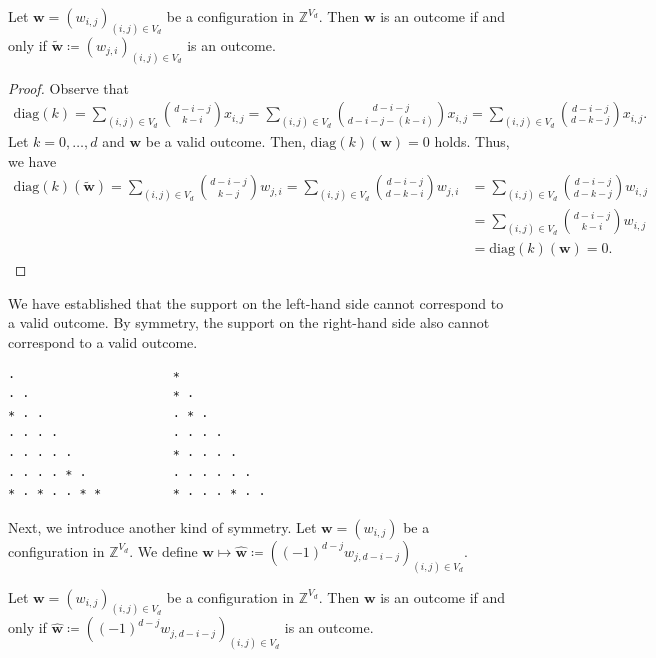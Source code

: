 \begin{proposition}\label{prop:symmetry}
    Let \( \mathbf{w} = (w_{i,j})_{(i,j) \in V_d} \) be a configuration in \( \mathbb{Z}^{V_d} \). Then \( \mathbf{w} \) is an outcome if and only if \(  \tilde{\mathbf{w}} \coloneqq (w_{j,i})_{(i,j) \in V_d} \) is an outcome.
\end{proposition}

\begin{proof}
    Observe that
    \begin{align*}
        \mathrm{diag}(k)  = \sum_{(i,j) \in V_d}\binom{d - i - j}{k-i} x_{i,j}
        = \sum_{(i,j) \in V_d}\binom{d - i - j}{d-i-j-(k-i)} x_{i,j}
        = \sum_{(i,j) \in V_d}\binom{d - i - j}{d-k-j} x_{i,j}.
    \end{align*}
    Let \(  k = 0, \dots, d \) and \(\mathbf{w} \) be a valid outcome. Then, \( \mathrm{diag}(k)(\mathbf{w}) = 0 \) holds. Thus, we have
    \begin{align*}
        \mathrm{diag}(k)(\tilde{\mathbf{w}}) = \sum_{(i,j) \in V_d}\binom{d - i - j}{k-j} w_{j,i}
        = \sum_{(i,j) \in V_d}\binom{d - i - j}{d-k-i} w_{j,i}
        &= \sum_{(i,j) \in V_d}\binom{d - i - j}{d-k-j} w_{i,j} \\
        &= \sum_{(i,j) \in V_d}\binom{d - i - j}{k-i} w_{i,j} \\
        &= \mathrm{diag}(k)(\mathbf w) = 0.
    \end{align*}
\end{proof}

\begin{example}
    We have established that the support on the left-hand side cannot correspond to a valid outcome. By symmetry, the support on the right-hand side also cannot correspond to a valid outcome.
    \begin{verbatim}
·                      *
· ·                    * ·
* · ·                  · * · 
· · · ·                · · · · 
· · · · ·              * · · · · 
· · · · * ·            · · · · · ·
* · * · · * *          * · · · * · ·
    \end{verbatim}
\end{example}

Next, we introduce another kind of symmetry. Let \( \mathbf{w} = (w_{i,j}) \) be a configuration in \( \mathbb{Z}^{V_d} \). We define \( \mathbf w \mapsto \hat{\mathbf w} \coloneqq \left( (-1)^{d-j} w_{j, d - i -j} \right)_{(i,j) \in V_d} \).

\begin{proposition}\label{prop:symmetry-2}
    Let \( \mathbf{w} = (w_{i,j})_{(i,j) \in V_d} \) be a configuration in \( \mathbb{Z}^{V_d} \). Then \( \mathbf{w} \) is an outcome if and only if \( \hat{\mathbf w} \coloneqq \left( (-1)^{d-j} w_{j, d - i -j} \right)_{(i,j) \in V_d} \) is an outcome.
\end{proposition}

